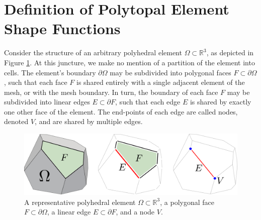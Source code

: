 \section{Definition of Polytopal Element Shape Functions}

	Consider the structure of an arbitrary polyhedral element $\Omega \subset \mathbb{R}^3$, as depicted in Figure \ref{fig:polyhedral_element}. At this juncture, we make no mention of a partition of the element into cells. The element's boundary $\partial \Omega$ may be subdivided into polygonal faces $F \subset \partial \Omega$, such that each face $F$ is shared entirely with a single adjacent element of the mesh, or with the mesh boundary. In turn, the boundary of each face $F$ may be subdivided into linear edges $E \subset \partial F$, such that each edge $E$ is shared by exactly one other face of the element. The end-points of each edge are called nodes, denoted $V$, and are shared by multiple edges.
	
\begin{figure} [!ht]
	\centering
	\includegraphics[width = 6.0in]{figures/polyhedron_decomposition.pdf}
	\caption{A representative polyhedral element $\Omega \subset \mathbb{R}^3$, a polygonal face $F \subset \partial \Omega$, a linear edge $E \subset \partial F$, and a node $V$.}
	\label{fig:polyhedral_element}
\end{figure}
	
